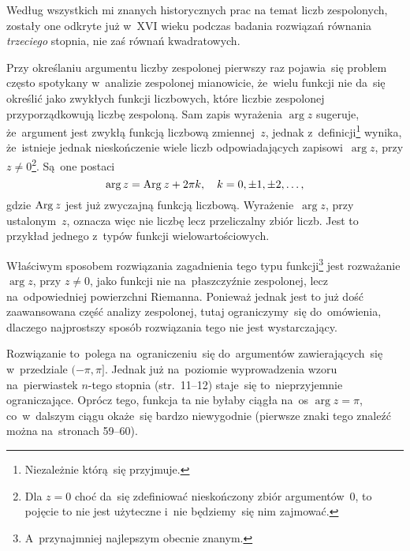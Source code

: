 \documentclass[a4paper,11pt]{article}
\begin{document}
\vspace{\spaceFour}


\start {} Według wszystkich mi znanych historycznych prac na
temat liczb zespolonych, zostały one odkryte już w~XVI wieku podczas
badania rozwiązań równania \emph{trzeciego} stopnia, nie zaś równań
kwadratowych. 

\vspace{\spaceFour}


\start {} Przy określaniu argumentu liczby zespolonej pierwszy
raz pojawia~się problem często spotykany w~analizie zespolonej
mianowicie, że~wielu funkcji nie da~się określić jako zwykłych funkcji
liczbowych, które liczbie zespolonej przyporządkowują liczbę
zespoloną. Sam zapis wyrażenia $\arg z$ sugeruje, że~argument jest
zwykłą funkcją liczbową zmiennej~$z$, jednak
z~definicji\footnote{Niezależnie którą~się przyjmuje.} wynika,
że~istnieje jednak nieskończenie wiele liczb odpowiadających
zapisowi~$\arg z$, przy $z \neq 0$\footnote{Dla $z = 0$ choć da~się
  zdefiniować nieskończony zbiór argumentów~0, to pojęcie to nie jest
  użyteczne i~nie będziemy~się nim zajmować.}. Są~one postaci
\begin{equation}
  \label{eq:Leja-06}
  \arg z = \textrm{Arg}\: z + 2\pi k, \quad k = 0, \pm 1, \pm 2,\ldots,
\end{equation}
gdzie $\textrm{Arg}\: z$ jest już zwyczajną funkcją liczbową.
Wyrażenie~$\arg z$, przy ustalonym~$z$, oznacza więc nie liczbę lecz
przeliczalny zbiór liczb. Jest to przykład jednego z~typów funkcji
wielowartościowych.

Właściwym sposobem rozwiązania zagadnienia tego typu
funkcji\footnote{A~przynajmniej najlepszym obecnie znanym.} jest
rozważanie $\arg z$, przy $z \neq 0$, jako funkcji nie na~płaszczyźnie
zespolonej, lecz na~odpowiedniej powierzchni Riemanna. Ponieważ jednak
jest to już dość zaawansowana część analizy zespolonej, tutaj
ograniczymy~się do~omówienia, dlaczego najprostszy sposób rozwiązania
tego nie jest wystarczający.

Rozwiązanie to~polega na~ograniczeniu~się do~argumentów
zawierających~się w~przedziale $( -\pi, \pi ]$. Jednak już na~poziomie
wyprowadzenia wzoru na~pierwiastek $n$-tego stopnia (str.~11--12)
staje~się to~nieprzyjemnie ograniczające. Oprócz tego, funkcja ta nie
byłaby ciągła na~os $\arg z = \pi$, co~w~dalszym ciągu okaże~się
bardzo niewygodnie (pierwsze znaki tego znaleźć można na~stronach
59--60).

\vspace{\spaceFour}
\end{document}
